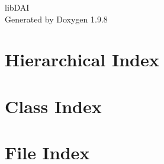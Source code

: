 \documentclass[twoside]{book}
\newcommand{\+}{\discretionary{\mbox{\scriptsize$\hookleftarrow$}}{}{}}
\newcommand{\clearemptydoublepage}{%
    \newpage{\pagestyle{empty}\cleardoublepage}%
  }
\begin{document}
  \raggedbottom
    \hypersetup{pageanchor=false,
                bookmarksnumbered=true,
                pdfencoding=unicode
               }
  \begin{titlepage}
  \vspace*{7cm}
  \begin{center}%
  {\Large lib\+DAI}\\
  \vspace*{1cm}
  {\large Generated by Doxygen 1.9.8}\\
  \end{center}
  \end{titlepage}
  \clearemptydoublepage
  \tableofcontents
  \clearemptydoublepage
  \hypersetup{pageanchor=true}




\chapter{Hierarchical Index}

\chapter{Class Index}

\chapter{File Index}

\end{document}
